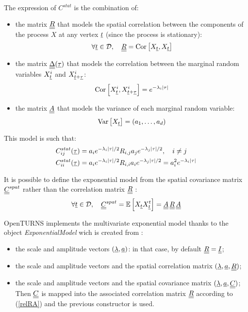 The expression of $C^{stat}$ is the combination of:
\begin{itemize}
\item the matrix ${\underline{\underline{R}}}$ that models the spatial correlation between the components of the process $X$ at any vertex ${\underline{t}}$ (since the process is stationary):
  \begin{equation}
    \label{fullMultivariateExponential1}
    \forall {\underline{t}}\in {\mathcal D},\quad {\underline{\underline{R}}} = {\rm Cor}\left[ X_{{\underline{t}}}, X_{{\underline{t}}} \right]
  \end{equation}

\item the matrix ${\underline{\underline{\Delta}}}( {\underline{\tau}} )$ that models the correlation between the marginal random variables  $X^i_{{\underline{t}}}$ and  $X^i_{{\underline{t}}+{\underline{\tau}}}$:
  \begin{align}
    {\rm Cor}\left[ X_{{\underline{t}}}^i,X^i_{{\underline{t}}+{\underline{\tau}}} \right] = e^{-\lambda_i|\tau|}
  \end{align}

\item the matrix ${\underline{\underline{A}}}$ that models the variance of each marginal random variable:
  \begin{align}
    {\rm Var}\left[ X_{{\underline{t}}} \right] = (a_1, \dots, a_d)
  \end{align}
\end{itemize}

This model is such that:
\begin{align}
  C_{ij}^{stat}({\underline{\tau}})&  = a_ie^{-\lambda_i|\tau|/2}R_{i,j}a_je^{-\lambda_j|\tau|/2},\quad i\neq j\\
  C_{ii}^{stat}({\underline{\tau}}) & =a_ie^{-\lambda_i|\tau|/2}R_{i,i}a_ie^{-\lambda_j|\tau|/2}=a_i^2e^{-\lambda_i|\tau|} \label{diago}
\end{align}

It is possible to define the exponential model from the spatial covariance matrix ${\underline{\underline{C}}}^{spat}$ rather than the correlation matrix ${\underline{\underline{R}}}$ :
\begin{equation}\label{relRA}
  \forall {\underline{t}} \in {\mathcal D},\quad {\underline{\underline{C}}}^{spat} = {\mathbb E}\left[ X_{{\underline{t}}}X^t_{{\underline{t}}} \right] = {\underline{\underline{A}}}\,{\underline{\underline{R}}}\, {\underline{\underline{A}}}
\end{equation}


OpenTURNS implements the multivariate exponential model thanks to the object {\itshape ExponentialModel} wich is created from :
\begin{itemize}
\item the scale and amplitude vectors $({\underline{\lambda}}, {\underline{a}})$: in that case, by default ${\underline{\underline{R}}} = {\underline{\underline{I}}}$;
\item the scale and amplitude vectors and the spatial correlation matrix  $({\underline{\lambda}}, {\underline{a}},{\underline{\underline{R}}})$;
\item the scale and amplitude vectors and the spatial covariance matrix  $({\underline{\lambda}}, {\underline{a}},{\underline{\underline{C}}})$; Then  ${\underline{\underline{C}}}$ is mapped into the associated correlation matrix ${\underline{\underline{R}}}$ according to (\ref{relRA}) and  the previous constructor is used.
\end{itemize}






